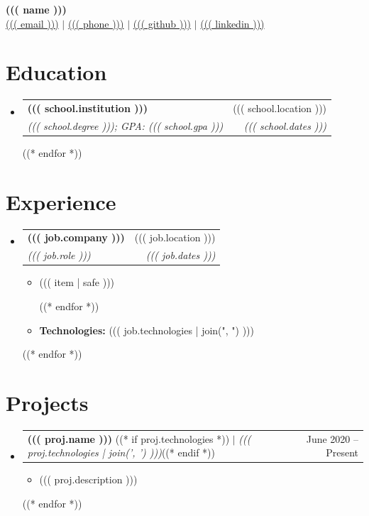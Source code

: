 \documentclass[letterpaper,11pt]{article}
\makeatletter
\newcommand{\resumeItem}[1]{
  \item\small{
    {#1 \vspace{-2pt}}
  }
}
\newcommand{\resumeSubheading}[4]{
  \vspace{-2pt}\item
    \begin{tabular*}{0.97\textwidth}[t]{l@{\extracolsep{\fill}}r}
      \textbf{#1} & #2 \\
      \textit{\small#3} & \textit{\small #4} \\
    \end{tabular*}\vspace{-7pt}
}
\newcommand{\resumeSubHeadingListStart}{\begin{itemize}[leftmargin=0.15in, label={}]}
\newcommand{\resumeSubHeadingListEnd}{\end{itemize}}
\newcommand{\resumeItemListStart}{\begin{itemize}}
\newcommand{\resumeItemListEnd}{\end{itemize}\vspace{-5pt}}
\newcommand{\technologies}[1]{
\noindent\textbf{Technologies:} #1
}
\newcommand{\resumeProjectHeading}[2]{
    \item
    \begin{tabular*}{0.97\textwidth}{l@{\extracolsep{\fill}}r}
      \small#1 & #2 \\
    \end{tabular*}\vspace{-7pt}
}
\makeatother
\begin{document}
\begin{center}
    {\LARGE \textbf{((( name )))}} \\[4pt]
    \normalsize
    \href{mailto:((( email )))}{((( email )))} $|$ 
    \href{tel:((( phone )))}{((( phone )))} $|$ 
    \href{((( "https://www." + github )))}{((( github )))} $|$ 
    \href{((( "https://www." + linkedin )))}{((( linkedin )))}

\end{center}

\section{Education}
  \resumeSubHeadingListStart
  ((* for school in education *))
    \resumeSubheading
      { ((( school.institution ))) }{ ((( school.location ))) }
      { ((( school.degree ))); GPA: ((( school.gpa ))) }{ ((( school.dates ))) }
    ((* endfor *))
  \resumeSubHeadingListEnd

\section{Experience}
  \resumeSubHeadingListStart
  ((* for job in work *))
    \resumeSubheading
      { ((( job.company ))) }{ ((( job.location ))) }
      { ((( job.role ))) }{ ((( job.dates ))) }
      \resumeItemListStart
      ((* for item in job.achievements *))
            \resumeItem{ ((( item | safe ))) }
      ((* endfor *))
      \resumeItem{ \technologies{((( job.technologies | join(", ") ))) } }
      \resumeItemListEnd
  ((* endfor *))
\resumeSubHeadingListEnd


\section{Projects}
\resumeSubHeadingListStart
((* for proj in projects *))
  \resumeProjectHeading
    {\textbf{ ((( proj.name ))) }((* if proj.technologies *)) $|$ \emph{((( proj.technologies | join(', ') )))}((* endif *))}
    {June 2020 -- Present}
  \resumeItemListStart
    \resumeItem{((( proj.description )))}
  \resumeItemListEnd
((* endfor *))
\resumeSubHeadingListEnd
\end{document}
